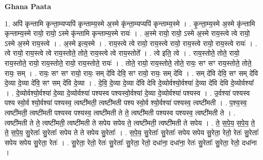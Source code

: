 \documentclass[17pt]{extarticle}
\begin{document}
\textbf{Ghana Paata } \newline

1. अपि॑ कृन्तामि कृन्ता॒म्यप्यपि॑ कृन्ताम्य॒स्मे अ॒स्मे कृ॑न्ता॒म्यप्यपि॑ कृन्ताम्य॒स्मे । . कृ॒न्ता॒म्य॒स्मे अ॒स्मे कृ॑न्तामि कृन्ताम्य॒स्मे रायो॒ रायो॒ ऽस्मे कृ॑न्तामि कृन्ताम्य॒स्मे रायः॑ । . अ॒स्मे रायो॒ रायो॒ ऽस्मे अ॒स्मे राय॒स्त्वे त्वे रायो॒ ऽस्मे अ॒स्मे राय॒स्त्वे । . अ॒स्मे इत्य॒स्मे । . राय॒स्त्वे त्वे रायो॒ राय॒स्त्वे रायो॒ राय॒स्त्वे रायो॒ राय॒स्त्वे रायः॑ । . त्वे रायो॒ राय॒स्त्वे त्वे राय॒स्तोते॒ तोते॒ राय॒स्त्वे त्वे राय॒स्तोते᳚ । . त्वे इति॒ त्वे । . राय॒स्तोते॒ तोते॒ रायो॒ राय॒स्तोते॒ रायो॒ राय॒स्तोते॒ रायो॒ राय॒स्तोते॒ रायः॑ । . तोते॒ रायो॒ राय॒स्तोते॒ तोते॒ रायः॒ सꣳ सꣳ राय॒स्तोते॒ तोते॒ रायः॒ सम् । . रायः॒ सꣳ सꣳ रायो॒ रायः॒ सम् दे॑वि देवि॒ सꣳ रायो॒ रायः॒ सम् दे॑वि । . सम् दे॑वि देवि॒ सꣳ सम् दे॑वि दे॒व्या दे॒व्या दे॑वि॒ सꣳ सम् दे॑वि दे॒व्या । . दे॒वि॒ दे॒व्या दे॒व्या दे॑वि देवि दे॒व्योर्वश्यो॒र्वश्या॑ दे॒व्या दे॑वि देवि दे॒व्योर्वश्या᳚ । . दे॒व्योर्वश्यो॒र्वश्या॑ दे॒व्या दे॒व्योर्वश्या॑ पश्यस्व पश्यस्वो॒र्वश्या॑ दे॒व्या दे॒व्योर्वश्या॑ पश्यस्व । . उ॒र्वश्या॑ पश्यस्व पश्य स्वो॒र्व श्यो॒र्वश्या॑ पश्यस्व॒ त्वष्टी॑मती॒ त्वष्टी॑मती पश्य स्वो॒र्व श्यो॒र्वश्या॑ पश्यस्व॒ त्वष्टी॑मती । . प॒श्य॒स्व॒ त्वष्टी॑मती॒ त्वष्टी॑मती पश्यस्व पश्यस्व॒ त्वष्टी॑मती ते ते॒ त्वष्टी॑मती पश्यस्व पश्यस्व॒ त्वष्टी॑मती ते । . त्वष्टी॑मती ते ते॒ त्वष्टी॑मती॒ त्वष्टी॑मती ते सपेय सपेय ते॒ त्वष्टी॑मती॒ त्वष्टी॑मती ते सपेय । . ते॒ स॒पे॒य॒ स॒पे॒य॒ ते॒ ते॒ स॒पे॒य॒ सु॒रेताः᳚ सु॒रेताः᳚ सपेय ते ते सपेय सु॒रेताः᳚ । . स॒पे॒य॒ सु॒रेताः᳚ सु॒रेताः᳚ सपेय सपेय सु॒रेता॒ रेतो॒ रेतः॑ सु॒रेताः᳚ सपेय सपेय सु॒रेता॒ रेतः॑ । . सु॒रेता॒ रेतो॒ रेतः॑ सु॒रेताः᳚ सु॒रेता॒ रेतो॒ दधा॑ना॒ दधा॑ना॒ रेतः॑ सु॒रेताः᳚ सु॒रेता॒ रेतो॒ दधा॑ना । \newline
\end{document}
